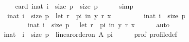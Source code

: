 \begin{isabellebody}
%
\isadelimproof
%
\endisadelimproof
%
\isatagproof
{}\isamarkupfalse%
\ {\isacharminus}{\kern0pt}\isanewline
\ \ \isamarkupfalse%
\ {}{}{\isacharcolon}{\kern0pt}\ {\isachardoublequoteopen}card\ {\isacharbraceleft}{\kern0pt}i{\isacharcolon}{\kern0pt}{\isacharcolon}{\kern0pt}nat{\isachardot}{\kern0pt}\ i\ {\isacharless}{\kern0pt}\ size\ p{\isacharbraceright}{\kern0pt}\ {\isacharequal}{\kern0pt}\ size\ p{\isachardoublequoteclose}\isanewline
\ \ \ \ \isamarkupfalse%
\ simp\isanewline
\ \ \isamarkupfalse%
\ {}{}{\isacharcolon}{\kern0pt}\isanewline
\ \ \ \ {\isachardoublequoteopen}{\isacharbraceleft}{\kern0pt}i{\isacharcolon}{\kern0pt}{\isacharcolon}{\kern0pt}nat{\isachardot}{\kern0pt}\ i\ {\isacharless}{\kern0pt}\ size\ p\ {\isasymand}\ {\isacharparenleft}{\kern0pt}let\ r\ {\isacharequal}{\kern0pt}\ {\isacharparenleft}{\kern0pt}p{\isacharbang}{\kern0pt}i{\isacharparenright}{\kern0pt}\ in\ {\isacharparenleft}{\kern0pt}y\ {\isasympreceq}\isactrlsub r\ x{\isacharparenright}{\kern0pt}{\isacharparenright}{\kern0pt}{\isacharbraceright}{\kern0pt}\ {\isacharequal}{\kern0pt}\isanewline
\ \ \ \ \ \ \ \ {\isacharbraceleft}{\kern0pt}i{\isacharcolon}{\kern0pt}{\isacharcolon}{\kern0pt}nat{\isachardot}{\kern0pt}\ i\ {\isacharless}{\kern0pt}\ size\ p{\isacharbraceright}{\kern0pt}\ {\isacharminus}{\kern0pt}\isanewline
\ \ \ \ \ \ \ \ \ \ {\isacharbraceleft}{\kern0pt}i{\isacharcolon}{\kern0pt}{\isacharcolon}{\kern0pt}nat{\isachardot}{\kern0pt}\ i\ {\isacharless}{\kern0pt}\ size\ p\ {\isasymand}\ {\isasymnot}\ {\isacharparenleft}{\kern0pt}let\ r\ {\isacharequal}{\kern0pt}\ {\isacharparenleft}{\kern0pt}p{\isacharbang}{\kern0pt}i{\isacharparenright}{\kern0pt}\ in\ {\isacharparenleft}{\kern0pt}y\ {\isasympreceq}\isactrlsub r\ x{\isacharparenright}{\kern0pt}{\isacharparenright}{\kern0pt}{\isacharbraceright}{\kern0pt}{\isachardoublequoteclose}\isanewline
\ \ \ \ \isamarkupfalse%
\ auto\isanewline
\ \ \isamarkupfalse%
\ {}{\isacharcolon}{\kern0pt}\ {\isachardoublequoteopen}{\isasymforall}\ i{\isacharcolon}{\kern0pt}{\isacharcolon}{\kern0pt}nat\ {\isachardot}{\kern0pt}\ i\ {\isacharless}{\kern0pt}\ size\ p\ {\isasymlongrightarrow}\ linear{\isacharunderscore}{\kern0pt}order{\isacharunderscore}{\kern0pt}on\ A\ {\isacharparenleft}{\kern0pt}p{\isacharbang}{\kern0pt}i{\isacharparenright}{\kern0pt}{\isachardoublequoteclose}\isanewline
\ \ \ \ \isamarkupfalse%
\ prof\ profile{\isacharunderscore}{\kern0pt}def\isanewline

\end{isabellebody}
